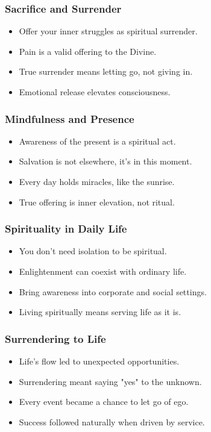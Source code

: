 \begin{frame}[fragile]\frametitle{Sacrifice and Surrender}
  \begin{itemize}
    \item Offer your inner struggles as spiritual surrender.
    \item Pain is a valid offering to the Divine.
    \item True surrender means letting go, not giving in.
    \item Emotional release elevates consciousness.
  \end{itemize}
\end{frame}

\begin{frame}[fragile]\frametitle{Mindfulness and Presence}
  \begin{itemize}
    \item Awareness of the present is a spiritual act.
    \item Salvation is not elsewhere, it's in this moment.
    \item Every day holds miracles, like the sunrise.
    \item True offering is inner elevation, not ritual.
  \end{itemize}
\end{frame}

\begin{frame}[fragile]\frametitle{Spirituality in Daily Life}
  \begin{itemize}
    \item You don’t need isolation to be spiritual.
    \item Enlightenment can coexist with ordinary life.
    \item Bring awareness into corporate and social settings.
    \item Living spiritually means serving life as it is.
  \end{itemize}
\end{frame}

\begin{frame}[fragile]\frametitle{Surrendering to Life}
  \begin{itemize}
    \item Life’s flow led to unexpected opportunities.
    \item Surrendering meant saying "yes" to the unknown.
    \item Every event became a chance to let go of ego.
    \item Success followed naturally when driven by service.
  \end{itemize}
\end{frame}

